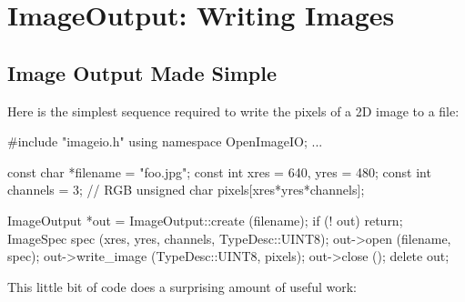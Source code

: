 \chapter{ImageOutput: Writing Images}
\label{chap:imageoutput}


\section{Image Output Made Simple}
\label{sec:imageoutput:simple}

Here is the simplest sequence required to write the pixels of a 2D image
to a file:

\begin{code}
        #include "imageio.h"
        using namespace OpenImageIO;
        ...

        const char *filename = "foo.jpg";
        const int xres = 640, yres = 480;
        const int channels = 3;  // RGB
        unsigned char pixels[xres*yres*channels];

        ImageOutput *out = ImageOutput::create (filename);
        if (! out)
            return;
        ImageSpec spec (xres, yres, channels, TypeDesc::UINT8);
        out->open (filename, spec);
        out->write_image (TypeDesc::UINT8, pixels);
        out->close ();
        delete out;
\end{code}

\noindent This little bit of code does a surprising amount of useful work:  

